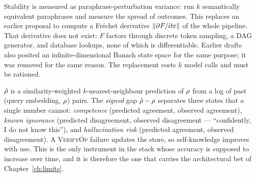 \begin{remark}\label{rem:perturbation}
Stability is measured as paraphrase-perturbation variance: run $k$
semantically equivalent paraphrases and measure the spread of outcomes.
This replaces an earlier proposal to compute a Fr\'echet derivative
$\left\lVert \partial F/\partial x \right\rVert$ of the whole pipeline. That derivative
does not exist: $F$ factors through discrete token sampling, a DAG
generator, and database lookups, none of which is differentiable.
Earlier drafts also posited an infinite-dimensional Banach state space
for the same purpose; it was removed for the same reason. The
replacement costs $k$ model calls and must be rationed.
\end{remark}

\begin{remark}\label{rem:rhohat}
$\hat{\rho}$ is a similarity-weighted $k$-nearest-neighbour
prediction of $\rho$ from a log of past (query embedding,
$\rho$) pairs. The \emph{signed} gap $\hat{\rho}-\rho$
separates three states that a single number cannot: \emph{competence}
(predicted agreement, observed agreement), \emph{known ignorance}
(predicted disagreement, observed disagreement --- ``confidently, I do
not know this''), and \emph{hallucination risk} (predicted agreement,
observed disagreement). A \textsc{VerifyOp} failure updates the store,
so self-knowledge improves with use. This is the only instrument in the
stack whose accuracy is supposed to increase over time, and it is
therefore the one that carries the architectural bet of
Chapter~\ref{ch:limits}.
\end{remark}
